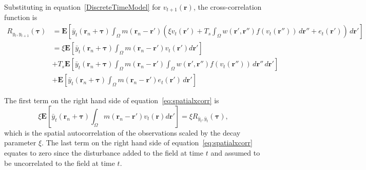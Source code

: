 \documentclass[]{article}
\begin{document}
Substituting in equation~\ref{DiscreteTimeModel}  for $v_{t+1}\left(\mathbf{r}\right)$, the cross-correlation function is
\begin{align}
	R_{y_{t},y_{t+1}}(\boldsymbol{\tau}) &= \mathbf{E}\left[\bar{y}_t\left(\mathbf{r}_n + \boldsymbol{\tau}\right) \int_{\Omega}{m\left(\mathbf{r}_n-\mathbf{r}'\right) \left(\xi v_t\left(\mathbf{r}'\right) +T_s \int_\Omega { w\left(\mathbf{r}',\mathbf{r}''\right) f\left(v_t\left(\mathbf{r}''\right)\right)\, d\mathbf{r}''} + e_t\left(\mathbf{r}'\right)\right)\, d\mathbf{r}'} \right] \\	
	 &= \xi\mathbf{E}\left[\bar{y}_t\left(\mathbf{r}_n + \boldsymbol{\tau}\right)\int_{\Omega}{ m\left(\mathbf{r}_n - \mathbf{r}'\right) v_t\left(\mathbf{r}'\right) d\mathbf{r}'} \right] \nonumber \\
	&+ T_s\mathbf{E}\left[\bar{y}_t\left(\mathbf{r}_n + \boldsymbol{\tau}\right) \int_{\Omega} {m\left(\mathbf{r}_n-\mathbf{r}'\right) \int_\Omega { w\left(\mathbf{r}',\mathbf{r}''\right) f\left(v_t\left(\mathbf{r}''\right)\right)\, d\mathbf{r}''}\, d\mathbf{r}'} \right] \nonumber \\
	&+ \mathbf{E}\left[\bar{y}_t\left(\mathbf{r}_n + \boldsymbol{\tau}\right)\int_{\Omega} { m\left(\mathbf{r}_n-\mathbf{r}'\right) e_t \left(\mathbf{r}'\right)\, d\mathbf{r}' } \right]
	\label{eq:spatialxcorr}
\end{align}

The first term on the right hand side of equation~\ref{eq:spatialxcorr} is
\begin{equation}
	\xi\mathbf{E}\left[\bar{y}_t\left(\mathbf{r}_n + \boldsymbol{\tau}\right) \int_{\Omega}{ m\left(\mathbf{r}_n-\mathbf{r}'\right) v_t\left(\mathbf{r}\right) d\mathbf{r}'} \right] = \xi R_{\bar{y}_{t},\bar{y}_{t}}(\boldsymbol{\tau}),
\end{equation}
which is the spatial autocorrelation of the observations scaled by the decay parameter $\xi$. The last term on the right hand side of equation~\ref{eq:spatialxcorr} equates to zero since the disturbance added to the field at time $t$ and assumed to be uncorrelated to the field at time $t$. 
\end{document}
